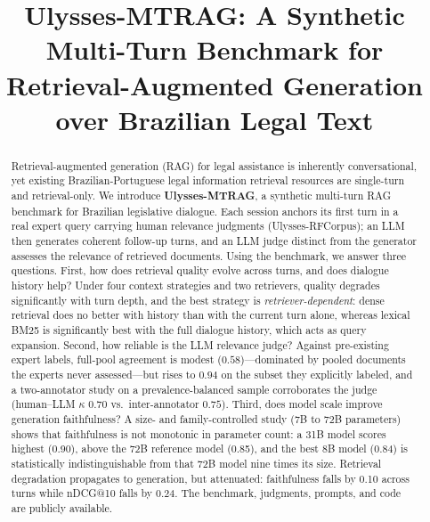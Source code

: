 \documentclass[conference]{IEEEtran}
\begin{document}
\title{Ulysses-MTRAG: A Synthetic Multi-Turn Benchmark for\\
Retrieval-Augmented Generation over Brazilian Legal Text}

\author{
}

\maketitle

\begin{abstract}
Retrieval-augmented generation (RAG) for legal assistance is inherently
conversational, yet existing Brazilian-Portuguese legal information retrieval
resources are single-turn and retrieval-only. We introduce \textbf{Ulysses-MTRAG},
a synthetic multi-turn RAG benchmark for Brazilian legislative dialogue. Each
session anchors its first turn in a real expert query carrying human relevance
judgments (Ulysses-RFCorpus); an LLM then generates coherent follow-up turns, and
an LLM judge distinct from the generator assesses the relevance of retrieved
documents. Using the benchmark, we answer three questions. First, how does
retrieval quality evolve across turns, and does dialogue history help? Under four
context strategies and two retrievers, quality degrades significantly with turn
depth, and the best strategy is \emph{retriever-dependent}: dense retrieval does no
better with history than with the current turn alone, whereas lexical BM25 is
significantly best with the full dialogue history, which acts as query expansion.
Second, how reliable is the LLM relevance judge? Against pre-existing expert
labels, full-pool agreement is modest ($0.58$)---dominated by pooled documents
the experts never assessed---but rises to $0.94$ on the subset they explicitly
labeled, and a two-annotator study on a prevalence-balanced sample corroborates
the judge (human--LLM $\kappa$ $0.70$ vs.\ inter-annotator $0.75$). Third, does
model scale improve generation faithfulness? A size- and family-controlled study
(7B to 72B parameters) shows that faithfulness is not monotonic in parameter
count: a 31B model scores highest (0.90), above the 72B reference model (0.85),
and the best 8B model (0.84) is statistically indistinguishable from that 72B
model nine times its size. Retrieval degradation propagates to generation, but
attenuated: faithfulness falls by 0.10 across turns while nDCG@10 falls by 0.24. The benchmark, judgments, prompts, and code are publicly available.
\end{abstract}
\end{document}
